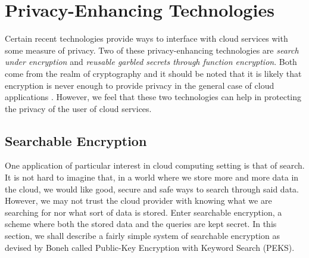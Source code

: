 \documentclass[11pt]{article}
\begin{document}



\section{Privacy-Enhancing Technologies}
\label{sec:pet}

Certain recent technologies provide ways to interface with cloud services with some measure of privacy.
Two of these privacy-enhancing technologies are \emph{search under encryption} and \emph{reusable garbled secrets through function encryption}.
Both come from the realm of cryptography and it should be noted that it is likely that encryption is never enough to provide privacy in the general case of cloud applications \cite{van2010impossibility}.
However, we feel that these two technologies can help in protecting the privacy of the user of cloud services.

\subsection{Searchable Encryption}

One application of particular interest in cloud computing setting is that of search.
It is not hard to imagine that, in a world where we store more and more data in the cloud, we would like good, secure and safe ways to search through said data.
However, we may not trust the cloud provider with knowing what we are searching for nor what sort of data is stored.
Enter searchable encryption, a scheme where both the stored data and the queries are kept secret.
In this section, we shall describe a fairly simple system of searchable encryption as devised by Boneh \cite{boneh2004public} called Public-Key Encryption with Keyword Search (PEKS).
\end{document}
